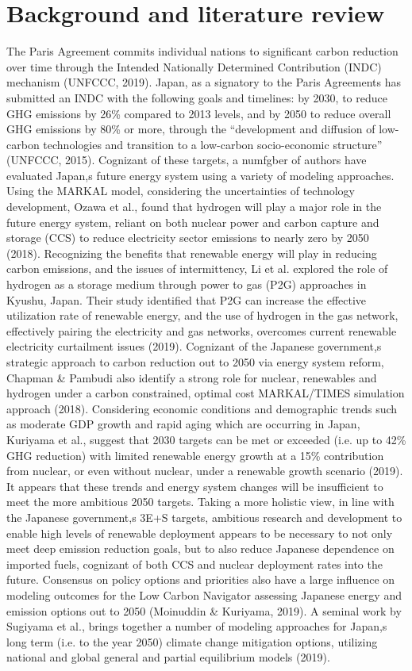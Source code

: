 \section{Background and literature review} \label{litreview}
The Paris Agreement commits individual nations to significant carbon reduction over time through the Intended Nationally Determined Contribution (INDC) mechanism (UNFCCC, 2019). Japan, as a signatory to the Paris Agreements has submitted an INDC with the following goals and timelines: by 2030, to reduce GHG emissions by 26\% compared to 2013 levels, and by 2050 to reduce overall GHG emissions by 80\% or more, through the “development and diffusion of low-carbon technologies and transition to a low-carbon socio-economic structure” (UNFCCC, 2015). Cognizant of these targets, a numfgber of authors have evaluated Japan,s future energy system using a variety of modeling approaches. Using the MARKAL model, considering the uncertainties of technology development, Ozawa et al., found that hydrogen will play a major role in the future energy system, reliant on both nuclear power and carbon capture and storage (CCS) to reduce electricity sector emissions to nearly zero by 2050 (2018). Recognizing the benefits that renewable energy will play in reducing carbon emissions, and the issues of intermittency, Li et al. explored the role of hydrogen as a storage medium through power to gas (P2G) approaches in Kyushu, Japan. Their study identified that P2G can increase the effective utilization rate of renewable energy, and the use of hydrogen in the gas network, effectively pairing the electricity and gas networks, overcomes current renewable electricity curtailment issues (2019). Cognizant of the Japanese government,s strategic approach to carbon reduction out to 2050 via energy system reform, Chapman & Pambudi also identify a strong role for nuclear, renewables and hydrogen under a carbon constrained, optimal cost MARKAL/TIMES simulation approach (2018). Considering economic conditions and demographic trends such as moderate GDP growth and rapid aging which are occurring in Japan, Kuriyama et al., suggest that 2030 targets can be met or exceeded (i.e. up to 42\% GHG reduction) with limited renewable energy growth at a 15\% contribution from nuclear, or even without nuclear, under a renewable growth scenario (2019). It appears that these trends and energy system changes will be insufficient to meet the more ambitious 2050 targets. Taking a more holistic view, in line with the Japanese government,s 3E+S targets, ambitious research and development to enable high levels of renewable deployment appears to be necessary to not only meet deep emission reduction goals, but to also reduce Japanese dependence on imported fuels, cognizant of both CCS and nuclear deployment rates into the future. Consensus on policy options and priorities also have a large influence on modeling outcomes for the  Low Carbon Navigator assessing Japanese energy and emission options out to 2050 (Moinuddin & Kuriyama, 2019). A seminal work by Sugiyama et al., brings together a number of modeling approaches for Japan,s long term (i.e. to the year 2050) climate change mitigation options, utilizing national and global general and partial equilibrium models (2019). 